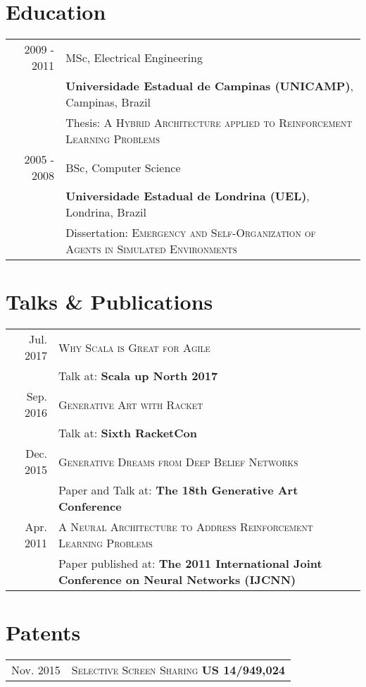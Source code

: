 \documentclass[a4paper,10pt]{article}
\begin{document}

\section{Education}
\begin{tabular}{rl}
2009 - 2011 & MSc, Electrical Engineering\\
& \textbf{Universidade Estadual de Campinas (UNICAMP)}, Campinas, Brazil\\
& Thesis: \textsc{A Hybrid Architecture applied to Reinforcement Learning Problems} \\
2005 - 2008 & BSc, Computer Science\\
& \textbf{Universidade Estadual de Londrina (UEL)}, Londrina, Brazil\\
& Dissertation: \textsc{Emergency and Self-Organization of Agents in Simulated Environments}
\end{tabular}

\section{Talks \& Publications}
\begin{tabular}{rl}
 Jul. 2017 & \textsc{Why Scala is Great for Agile}\\
                   & Talk at: \textbf{Scala up North 2017}\\
 Sep. 2016 & \textsc{Generative Art with Racket}\\
                     & Talk at: \textbf{Sixth RacketCon}\\
 Dec. 2015 & \textsc{Generative Dreams from Deep Belief Networks}\\
                   & Paper and Talk at: \textbf{The 18th Generative Art Conference}\\
 Apr. 2011 & \textsc{A Neural Architecture to Address Reinforcement Learning Problems}\\
                   & Paper published at: \textbf{The 2011 International Joint Conference on Neural Networks (IJCNN)}\\
\end{tabular}

\section{Patents}
\begin{tabular}{rl}
 Nov. 2015 & \textsc{Selective Screen Sharing} \textbf{US 14/949,024}\\
\end{tabular}
\end{document}
